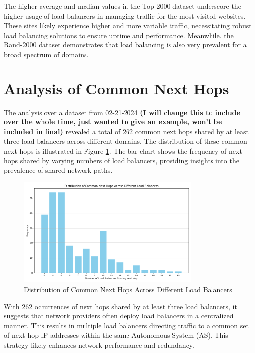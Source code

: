 \documentclass[12pt]{cwru_thesis}
\begin{document}
The higher average and median values in the Top-2000 dataset underscore the higher usage of load balancers in managing traffic for the most visited websites. These sites likely experience higher and more variable traffic, necessitating robust load balancing solutions to ensure uptime and performance. Meanwhile, the Rand-2000 dataset demonstrates that load balancing is also very prevalent for a broad spectrum of domains.





\section{Analysis of Common Next Hops}
The analysis over a dataset from 02-21-2024 \textbf{(I will change this to include over the whole time, just wanted to give an example, won't be included in final)} revealed a total of 262 common next hops shared by at least three load balancers across different domains. The distribution of these common next hops is illustrated in Figure \ref{fig:common_next_hops_distribution}. The bar chart shows the frequency of next hops shared by varying numbers of load balancers, providing insights into the prevalence of shared network paths.

\begin{figure}[h]
    \centering
    \includegraphics[width=0.8\textwidth]{figures/common_next_hops_distribution.png}
    \caption{Distribution of Common Next Hops Across Different Load Balancers }
    \label{fig:common_next_hops_distribution}
\end{figure}

With 262 occurrences of next hops shared by at least three load balancers, it suggests that network providers often deploy load balancers in a centralized manner. This results in multiple load balancers directing traffic to a common set of next hop IP addresses within the same Autonomous System (AS). This strategy likely enhances network performance and redundancy.
\end{document}
